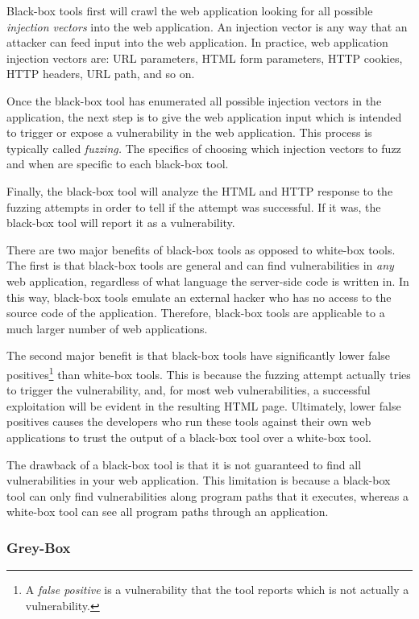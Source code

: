 Black-box tools first will crawl the web application looking for all
possible \emph{injection vectors} into the web application. An
injection vector is any way that an attacker can feed input into the
web application. In practice, web application injection vectors are:
URL parameters, HTML form parameters, HTTP cookies, HTTP headers, URL
path, and so on.

Once the black-box tool has enumerated all possible injection vectors
in the application, the next step is to give the web application input
which is intended to trigger or expose a vulnerability in the web
application. This process is typically called \emph{fuzzing.} The
specifics of choosing which injection vectors to fuzz and when are
specific to each black-box tool. 

Finally, the black-box tool will analyze the HTML and HTTP response to
the fuzzing attempts in order to tell if the attempt was successful.
If it was, the black-box tool will report it as a vulnerability.

There are two major benefits of black-box tools as opposed to
white-box tools. The first is that black-box tools are general and can
find vulnerabilities in \emph{any} web application, regardless of what
language the server-side code is written in. In this way, black-box
tools emulate an external hacker who has no access to the source code
of the application. Therefore, black-box tools are applicable to a
much larger number of web applications. 

The second major benefit is that black-box tools have significantly
lower false positives\footnote{A \emph{false positive} is a
  vulnerability that the tool reports which is not actually a
  vulnerability.} than white-box tools. This is because the fuzzing
attempt actually tries to trigger the vulnerability, and, for most web
vulnerabilities, a successful exploitation will be evident in the
resulting HTML page. Ultimately, lower false positives causes the
developers who run these tools against their own web applications to
trust the output of a black-box tool over a white-box tool.

The drawback of a black-box tool is that it is not guaranteed to find
all vulnerabilities in your web application. This limitation is
because a black-box tool can only find vulnerabilities along program
paths that it executes, whereas a white-box tool can see all program
paths through an application.

\subsubsection{Grey-Box}

